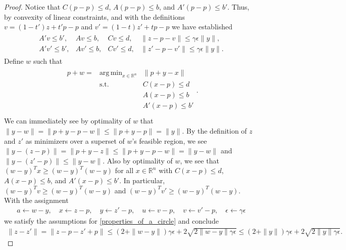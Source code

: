 \documentclass{article}
\theoremstyle{case}
\numberwithin{theorem}{subsection}
\DeclareMathOperator*{\argmin}{arg\,min}
\newcommand{\Rn}{\mathbb R^n}
\begin{document}
\begin{proof}
Notice that $C (p-p) \le d$, $A (p-p) \le b$, and $A' (p-p) \le b'$.
Thus, by convexity of linear constraints, and with the definitions
$v = (1-t') z + t'p - p$ and $v' = (1-t) z' + tp - p$
we have established
\begin{align*}
\begin{array}{cccc}
A'v  \le b', & Av  \le b, & Cv  \le d, & \|z  - p - v \| \le \gamma \epsilon \|y\|, \\
A'v' \le b', & Av' \le b, & Cv' \le d, & \|z' - p - v'\| \le \gamma \epsilon \|y\|.
\end{array}
\end{align*}
Define $w$ such that
\begin{align*}
\begin{array}{ccc}
p + w = & \argmin_{x \in \Rn}	& \|p + y - x\|			\\
		& \textrm{s.t.}			& C(x - p) \le d		\\
		& 						& A (x - p) \le b		\\
		& 						& A' (x - p) \le b'		\\
\end{array}.
\end{align*}
We can immediately see by optimality of $w$ that 
$\|y - w\| = \|p + y - p - w\| \le \|p + y - p\| = \|y\|$.
By the definition of $z$ and $z'$ as minimizers over a superset of $w$'s feasible region, we see
$\|y - (z - p)\| = \|p + y - z\| \le \|p + y - p - w\| = \|y - w\|$
and 
$\|y - (z' - p)\| \le \|y - w\|$.
Also by optimality of $w$, we see that 
$(w - y)^T x \ge (w - y)^T(w - y)$ for all $x \in \Rn$ with $C(x - p) \le d$, $A(x - p) \le b$, and $A'(x - p) \le b'$.
In particular, $(w - y)^T v \ge (w - y)^T(w - y)$ and $(w - y)^T v' \ge (w - y)^T(w - y)$.
With the assignment
\begin{align*}
a \gets w - y,			\quad
x \gets	z  - p,			\quad
y \gets	z' - p,			\quad
u \gets v - p,			\quad
v \gets v' - p,			\quad
\epsilon \gets \gamma \epsilon
\end{align*}
we satisfy the assumptions for
\cref{properties_of_a_circle}
and conclude
\begin{align*}
\|z - z'\| = \|z - p - z' + p\|
\le \left(2 + \|w - y\|\right) \gamma \epsilon + 2 \sqrt{2\|w - y\|\gamma \epsilon}
\le \left(2 + \|y\|\right) \gamma \epsilon + 2 \sqrt{2\|y\|\gamma \epsilon}.
\end{align*}
\end{proof}

\color{black}
\end{document}
